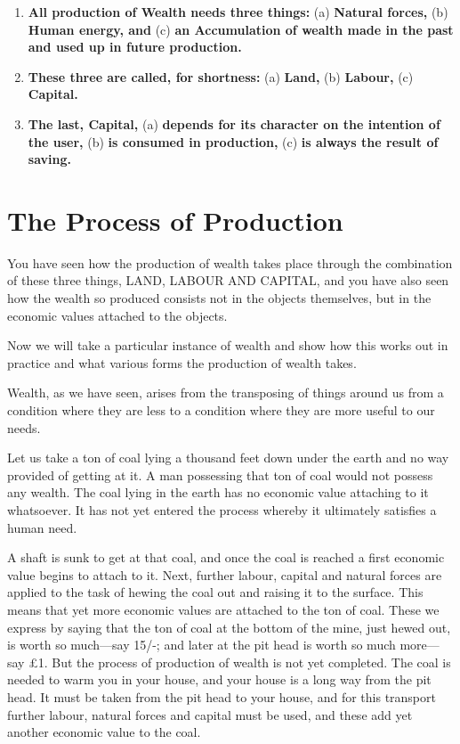 \documentclass{book}
\begin{document}
\begin{enumerate}
	\item \textbf{All production of Wealth needs three things:} (a) \textbf{Natural forces,} (b) \textbf{Human energy, and} (c) \textbf{an Accumulation of wealth made in the past and used up in future production.}

	\item \textbf{These three are called, for shortness:} (a) \textbf{Land,} (b) \textbf{Labour,} (c) \textbf{Capital.}

	\item \textbf{The last, Capital,} (a) \textbf{depends for its character on the intention of the user,} (b) \textbf{is consumed in production,} (c) \textbf{is always the result of saving.}

\end{enumerate}

\chapter{The Process of Production}
\label{chapter-3}
You have seen how the production of wealth takes place through the combination of these three things, LAND, LABOUR AND CAPITAL, and you have also seen how the wealth so produced consists not in the objects themselves, but in the economic values attached to the objects.

Now we will take a particular instance of wealth and show how this works out in practice and what various forms the production of wealth takes.

Wealth, as we have seen, arises from the transposing of things around us from a condition where they are less to a condition where they are more useful to our needs.

Let us take a ton of coal lying a thousand feet down under the earth and no way provided of getting at it. A man possessing that ton of coal would not possess any wealth. The coal lying in the earth has no economic value attaching to it whatsoever. It has not yet entered the process whereby it ultimately satisfies a human need.

A shaft is sunk to get at that coal, and once the coal is reached a first economic value begins to attach to it. Next, further labour, capital and natural forces are applied to the task of hewing the coal out and raising it to the surface. This means that yet more economic values are attached to the ton of coal. These we express by saying that the ton of coal at the bottom of the mine, just hewed out, is worth so much—say 15/-; and later at the pit head is worth so much more—say £1. But the process of production of wealth is not yet completed. The coal is needed to warm you in your house, and your house is a long way from the pit head. It must be taken from the pit head to your house, and for this transport further labour, natural forces and capital must be used, and these add yet another economic value to the coal.
\end{document}
